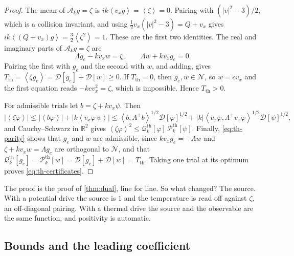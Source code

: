 \documentclass[11pt]{article}
\newcommand{\av}[1]{\left\langle #1\right\rangle}
\newcommand{\D}{\mathcal D}
\newcommand{\A}{\mathcal A}
\newcommand{\RR}{\mathbb R}
\newcommand{\N}{\mathcal N}
\newcommand{\thr}{\mathrm{th}}
\newcommand{\Qth}{\mathcal Q^{\thr}}
\newcommand{\Pth}{\mathcal P^{\thr}}
\newcommand{\dual}[1]{\left\langle #1,\Lambda^+ #1\right\rangle}
\theoremstyle{definition}
\theoremstyle{remark}
\numberwithin{equation}{section}
\begin{document}
\begin{proof}
The mean of $\A_kg=\zeta$ is $ik\av{v_xg}=\av\zeta=0$. Pairing with
$(|v|^2-3)/2$, which is a collision invariant, and using
$\tfrac12v_x(|v|^2-3)=Q+v_x$ gives $ik\av{(Q+v_x)g}=\tfrac32\av{\zeta^2}=1$.
These are the first two identities. The real and imaginary parts of
$\A_kg=\zeta$ are
\begin{equation}
 \Lambda g_e-kv_xw=\zeta,\qquad \Lambda w+kv_xg_e=0 .
 \label{eq:th-parity}
\end{equation}
Pairing the first with $g_e$ and the second with $w$, and adding, gives
$T_\thr=\av{\zeta g_e}=\D[g_e]+\D[w]\geq0$. If $T_\thr=0$, then $g_e,w\in\N$,
so $w=cv_x$ and the first equation reads $-kcv_x^2=\zeta$, which is
impossible. Hence $T_\thr>0$.

For admissible trials let $b=\zeta+kv_x\psi$. Then
\[
 |\av{\zeta\varphi}|\leq|\av{b\varphi}|+|k\av{v_x\varphi\,\psi}|
 \leq\dual b^{1/2}\D[\varphi]^{1/2}
      +|k|\dual{v_x\varphi}^{1/2}\D[\psi]^{1/2},
\]
and Cauchy--Schwarz in $\RR^2$ gives
$\av{\zeta\varphi}^2\leq\Qth_k[\varphi]\,\Pth_k[\psi]$. Finally,
\eqref{eq:th-parity} shows that $g_e$ and $w$ are admissible, since
$kv_xg_e=-\Lambda w$ and $\zeta+kv_xw=\Lambda g_e$ are orthogonal to $\N$,
and that $\Qth_k[g_e]=\Pth_k[w]=\D[g_e]+\D[w]=T_\thr$. Taking one trial at its
optimum proves \eqref{eq:th-certificates}.
\end{proof}

The proof is the proof of \cref{thm:dual}, line for line. So what changed? The source. With a potential drive the
source is $1$ and the temperature is read off against $\zeta$, an
off-diagonal pairing. With a thermal drive the source and the observable
are the same function, and positivity is automatic.

\subsection{Bounds and the leading coefficient}
\end{document}

